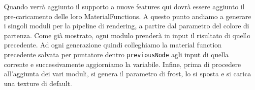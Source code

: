 \documentclass[main.tex]{subfiles}
\begin{document}
Quando verrà aggiunto il supporto a nuove features qui dovrà essere aggiunto il pre-caricamento delle loro MaterialFunctions.
\newline
\indent A questo punto andiamo a generare i singoli moduli per la pipeline di rendering, a partire dal parametro del colore di partenza. Come già mostrato, ogni modulo prenderà in input il risultato di quello precedente. Ad ogni generazione quindi colleghiamo la material function precedente salvata per puntatore dentro \lstinline{previousNode} agli input di quella corrente e successivamente aggiorniamo la variabile. Infine, prima di procedere all'aggiunta dei vari moduli, si genera il parametro di frost, lo si sposta e si carica una texture di default. \newline
% 
%
%
\end{document}
